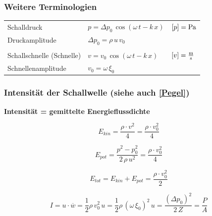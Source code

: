 \subsubsection{Weitere Terminologien}

\renewcommand{\arraystretch}{1.2}
\begin{tabular}{lll}
Schalldruck & $p = \Delta p_0 \, \cos(\omega \, t - k \, x)$ & $[p] = \mathrm{Pa}$ \\
Druckamplitude & $  \Delta p_0 = \rho \, u \, v_0 $ & \\
\\
Schallschnelle (Schnelle) & $v = v_0 \,  \cos(\omega \, t - k \, x)$ & $[v] = \frac{\mathrm{m}}{\mathrm{s}}$ \\
Schnellenamplitude & $v_0 = \omega \, \xi_0$ 
\end{tabular}
\renewcommand{\arraystretch}{1}





\subsubsection{Intensität der Schallwelle (siehe auch \ref{Pegel})}

\textbf{Intensität = gemittelte Energieflussdichte} \\

\begin{minipage}{0.48\linewidth}
$$ E_{kin} = \frac{\rho \cdot v^2}{4} = \frac{\rho \cdot v_0^2}{4} $$
\end{minipage}
\hfill
\begin{minipage}{0.48\linewidth}
$$ E_{pot} = \frac{p^2 - p_0^2}{2 \, \rho \, u^2} = \frac{\rho \cdot v_0^2}{4} $$
\end{minipage}

$$ E_{tot} = E_{kin} + E_{pot} = \frac{\rho \cdot v_0^2}{2} $$


$$ \boxed{ I = u \cdot \overline{w} = \frac{1}{2} \rho \, v_0^2 \, u  =  \frac{1}{2} \rho \, (\omega \, \xi_0)^2  \, u = \frac{( \Delta p_0)^2}{2 \, Z} = \frac{P}{A} } $$

\vspace{0.2cm}

